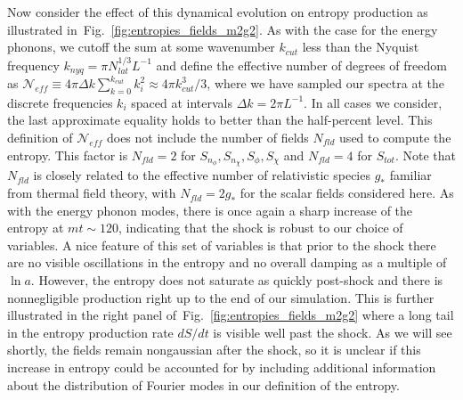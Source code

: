 \documentclass[11pt,a4paper]{article}
\newcommand{\figref}[1]{Fig.~\ref{#1}}
\begin{document}
Now consider the effect of this dynamical evolution on entropy production as illustrated in~\figref{fig:entropies_fields_m2g2}.
As with the case for the energy phonons, we cutoff the sum at some wavenumber $k_{cut}$ less than the Nyquist frequency $k_{nyq}=\pi N_{lat}^{1/3}L^{-1}$ and define the effective number of degrees of freedom as $\mathcal{N}_{eff} \equiv 4\pi\Delta k\sum_{k=0}^{k_{cut}} k_i^2 \approx 4\pi k_{cut}^3/3$, where we have sampled our spectra at the discrete frequencies $k_i$ spaced at intervals $\Delta k = 2\pi L^{-1}$.  In all cases we consider, the last approximate equality holds to better than the half-percent level.  This definition of $\mathcal{N}_{eff}$ does not include the number of fields $N_{fld}$ used to compute the entropy.
This factor is $N_{fld}=2$ for $S_{n_\phi},S_{n_\chi},S_\phi,S_\chi$ and $N_{fld}=4$ for $S_{tot}$.
Note that $N_{fld}$ is closely related to the effective number of relativistic species $g_*$ familiar from thermal field theory, with $N_{fld}=2g_*$ for the scalar fields considered here.
As with the energy phonon modes, there is once again a sharp increase of the entropy at $mt\sim 120$, indicating that the shock is robust to our choice of variables.
A nice feature of this set of variables is that prior to the shock there are no visible oscillations in the entropy and no overall damping as a multiple of $\ln a$.
However, the entropy does not saturate as quickly post-shock and there is nonnegligible production right up to the end of our simulation.
This is further illustrated in the right panel of~\figref{fig:entropies_fields_m2g2} where a long tail in the entropy production rate $dS/dt$ is visible well past the shock.
As we will see shortly, the fields remain nongaussian after the shock, so it is unclear if this increase in entropy could be accounted for by including additional information about the distribution of Fourier modes in our definition of the entropy.
\end{document}
